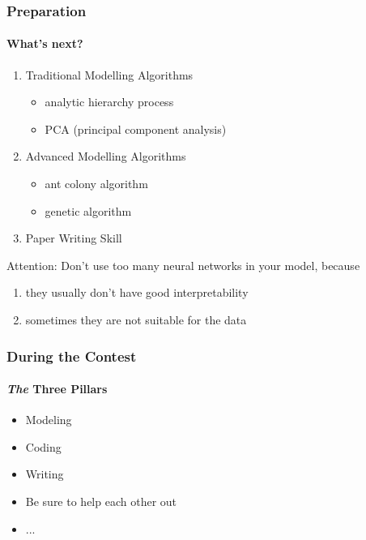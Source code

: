 \documentclass{beamer}
\begin{document}
\begin{frame}
    \frametitle{Preparation}
    \framesubtitle{What's next?}
    \begin{enumerate}
        \setlength{\itemsep}{5pt}
        \item Traditional Modelling Algorithms
        \begin{itemize}
            \setlength{\itemsep}{5pt}
            \item analytic hierarchy process
            \item PCA (principal component analysis)
        \end{itemize}
        \item{Advanced Modelling Algorithms}
        \begin{itemize}
            \setlength{\itemsep}{5pt}
            \item ant colony algorithm
            \item genetic algorithm
        \end{itemize}
        \item Paper Writing Skill
    \end{enumerate}
    \alert{Attention: Don't use too many neural networks in your model}, because
    \begin{enumerate}
        \item they usually don't have good interpretability
        \item sometimes they are not suitable for the data
    \end{enumerate}
\end{frame}


\begin{frame}
    \frametitle{During the Contest}
    \framesubtitle{\textit{The} Three Pillars}
    \begin{itemize}
        \setlength{\itemsep}{5pt}
        \item Modeling
        \item Coding
        \item Writing
    \end{itemize}
    \vspace{20pt}
    \begin{itemize}
        \setlength{\itemsep}{5pt}
        \item Be sure to help each other out
        \item ...
    \end{itemize}
\end{frame}
\end{document}
